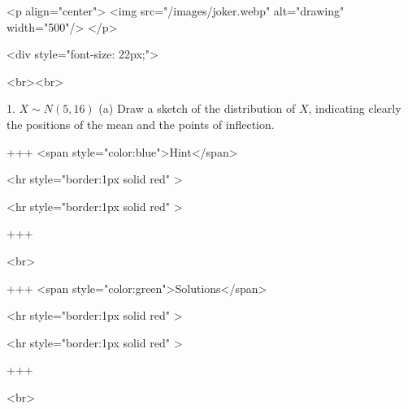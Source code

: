 <p align="center">
<img src="/images/joker.webp" alt="drawing" width="500"/>
</p>

<div style="font-size: 22px;">

<br><br>

1. $X \sim N(5,16)$
(a) Draw a sketch of the distribution of $X$, indicating clearly the positions of the mean and the points of inflection.

+++ <span style="color:blue">Hint</span>

<hr style="border:1px solid red" >

<hr style="border:1px solid red" >

+++

<br>

+++ <span style="color:green">Solutions</span>

<hr style="border:1px solid red" >

<hr style="border:1px solid red" >

+++

<br>

